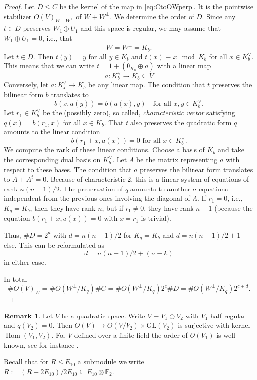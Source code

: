\documentclass[a4paper]{amsart}
\theoremstyle{definition}
\newtheorem{remark}[definition]{Remark}
\theoremstyle{plain}
\DeclareMathOperator{\Hom}{Hom}
\newcommand{\FF}{\mathbb{F}}
\begin{document}
\begin{proof}
Let $D \leq C$ be the kernel of the map in \cref{eq:CtoOWperp}. It is the pointwise stabilizer $O(V)_{W+W^\perp}$ of $W+W^\perp$. We determine the order of $D$.
Since any $t \in D$ preserves $W_1\oplus U_1$ and this space is regular, we may assume that $W_1 \oplus U_1 =0$, i.e., that 
\[W=W^\perp = K_b.\]
Let $t \in D$. Then $t(y)=y$ for all $y \in K_b$ and $t(x)\equiv x \mod K_b$ for all $x \in K_b^\vee$.
This means that we can write $t = 1 + (0_{K_b}\oplus a)$ with a linear map 
\[a\colon K_b^\vee \to K_b \subseteq V\]
Conversely, let $a\colon K_b^\vee \to K_b$ be any linear map. The condition that $t$ preserves the bilinear form $b$ translates to 
\[b(x,a(y))=b(a(x),y) \quad  \mbox{for all } x,y \in K_b^\vee.\] 
Let $r_1 \in K_b^\vee$ be the (possibly zero), so called, \emph{characteristic vector} satisfying $q(x) = b(r_1,x)$ for all $x \in K_b$. That $t$ also preserves the quadratic form $q$ amounts to the linear condition
\[b(r_1+x,a(x))=0 \mbox{ for all } x \in K_b^\vee.\] 
We compute the rank of these linear conditions.
Choose a basis of $K_b$ and take the corresponding dual basis on $K_b^\vee$. Let $A$ be the matrix representing $a$ with respect to these bases. The condition that $a$ preserves the bilinear form translates to $A+A^t=0$. Because of characteristic $2$, this is a linear system of equations of rank $n(n-1)/2$.
The preservation of $q$ amounts to another $n$ equations independent from the previous ones involving the diagonal of $A$. 
If $r_1 = 0$, i.e., $K_q=K_b$, then they have rank $n$, but if $r_1\neq 0$, they have rank $n-1$ (because the equation $b(r_1+x,a(x))=0$ with $x=r_1$ is trivial). 

Thus, $\# D = 2^d$ with $d=n(n-1)/2$ for $K_q=K_b$ and $d=n(n-1)/2+1$ else.
This can be reformulated as 
\[d = n(n-1)/2+(n-k)\] 
in either case.

In total 
\[\# O(V)_W = \# O(W^\perp/K_q) \# C = \# O(W^\perp/K_q) 2^c \# D = \# O(W^\perp/K_q) 2^{c+d}. \]
\end{proof}
\begin{remark}
Let $V$ be a quadratic space. Write $V=V_1 \oplus V_2$ with $V_1$ half-regular and $q(V_2)=0$. 
Then $O(V) \to O(V/V_2) \times \mathrm{GL}(V_2)$ is surjective with kernel $\Hom(V_1,V_2)$.
For $V$ defined over a finite field the order of $O(V_1)$ is well known, see for instance \cite[(13.3)]{kneser}.
\end{remark}

Recall that for $R \leq E_{10}$ a submodule we write $\overline{R}:=(R+2E_{10})/2E_{10}\subseteq E_{10}\otimes \FF_2$.
\end{document}
